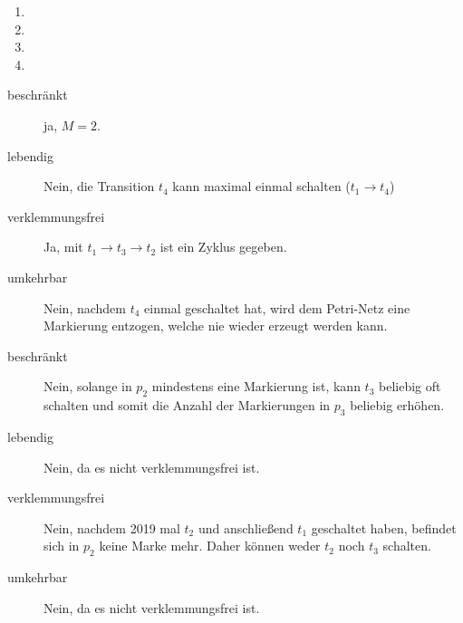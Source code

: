 \documentclass{bschlangaul-aufgabe}
\begin{document}
\begin{enumerate}
\item {}
\item {}
\item {}
\item {}

\end{enumerate}

\begin{bAntwort}


\tikzset{/petri/.cd,x=2,y=2,scale=0.45}

\noindent
{}
%
%
%

\begin{description}
\item[beschränkt] ja, $M = 2$.

\item[lebendig] Nein, die Transition $t_4$ kann maximal einmal schalten
(\zB $t_1 \rightarrow t_4$)

\item[verklemmungsfrei] Ja, mit $t_1 \rightarrow t_3 \rightarrow  t_2$
ist ein Zyklus gegeben.

\item[umkehrbar] Nein, nachdem $t_4$ einmal geschaltet hat, wird dem
Petri-Netz eine Markierung entzogen, welche nie wieder erzeugt werden
kann.
\end{description}


\begin{description}
\item[beschränkt] Nein, solange in $p_2$ mindestens eine Markierung ist,
kann $t_3$ beliebig oft schalten und somit die Anzahl der Markierungen
in $p_3$ beliebig erhöhen.

\item[lebendig] Nein, da es nicht verklemmungsfrei ist.

\item[verklemmungsfrei] Nein, nachdem 2019 mal $t_2$ und anschließend
$t_1$ geschaltet haben, befindet sich in $p_2$ keine Marke mehr. Daher
können weder $t_2$ noch $t_3$ schalten.

\item[umkehrbar]
Nein, da es nicht verklemmungsfrei ist.
\end{description}


\end{bAntwort}
\end{document}
